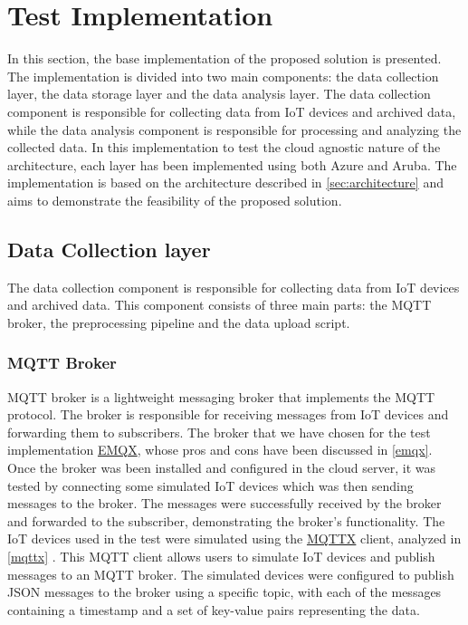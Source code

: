 \section{Test Implementation}

In this section, the base implementation of the proposed solution is presented. The implementation is divided into two main components: the data collection layer, the data storage layer and the data analysis layer. The data collection component is responsible for collecting data from IoT devices and archived data, while the data analysis component is responsible for processing and analyzing the collected data. In this implementation to test the cloud agnostic nature of the architecture, each layer has been implemented using both Azure and Aruba. The implementation is based on the architecture described in \ref{sec:architecture} and aims to demonstrate the feasibility of the proposed solution. 

\subsection{Data Collection layer}

The data collection component is responsible for collecting data from IoT devices and archived data. This component consists of three main parts: the MQTT broker, the preprocessing pipeline and the data upload script.

\subsubsection{MQTT Broker}
MQTT broker is a lightweight messaging broker that implements the MQTT protocol. The broker is responsible for receiving messages from IoT devices and forwarding them to subscribers.  
The broker that we have chosen for the test implementation \href{https://www.emqx.io/}{EMQX}, whose pros and cons have been discussed in \ref{emqx}.
Once the broker was been installed and configured in the cloud server, it was tested by connecting some simulated IoT devices which was then sending messages to the broker. The messages were successfully received by the broker and forwarded to the subscriber, demonstrating the broker's functionality.
The IoT devices used in the test were simulated using the \href{https://mqttx.app/}{MQTTX} client, analyzed in \ref{mqttx} . This MQTT client allows users to simulate IoT devices and publish messages to an MQTT broker. The simulated devices were configured to publish JSON messages to the broker using a specific topic, with each of the messages containing a timestamp and a set of key-value pairs representing the data.

